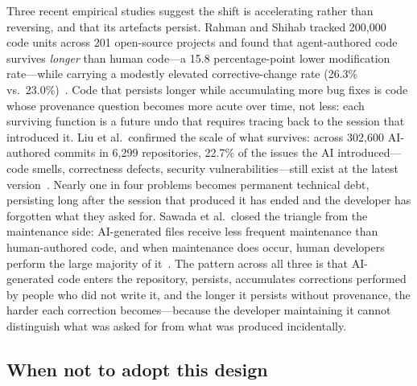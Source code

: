 Three recent empirical studies suggest the shift is accelerating rather than
reversing, and that its artefacts persist. Rahman and Shihab tracked 200{,}000 code
units across 201 open-source projects and found that agent-authored code survives
\emph{longer} than human code---a 15.8 percentage-point lower modification rate---while
carrying a modestly elevated corrective-change rate (26.3\% vs.\
23.0\%)~\cite{rahman2026survive}. Code that persists longer while accumulating more bug
fixes is code whose provenance question becomes more acute over time, not less: each
surviving function is a future undo that requires tracing back to the session that
introduced it. Liu et al.\ confirmed the scale of what survives: across 302{,}600
AI-authored commits in 6{,}299 repositories, 22.7\% of the issues the AI
introduced---code smells, correctness defects, security vulnerabilities---still exist at
the latest version~\cite{liu2026debt}. Nearly one in four problems becomes permanent
technical debt, persisting long after the session that produced it has ended and the
developer has forgotten what they asked for. Sawada et al.\ closed the triangle from the
maintenance side: AI-generated files receive less frequent maintenance than human-authored
code, and when maintenance does occur, human developers perform the large majority of
it~\cite{sawada2026maintenance}. The pattern across all three is that AI-generated code
enters the repository, persists, accumulates corrections performed by people who did not
write it, and the longer it persists without provenance, the harder each correction
becomes---because the developer maintaining it cannot distinguish what was asked for from
what was produced incidentally.

\subsection{When not to adopt this design}
\label{sec:non-adoption}

